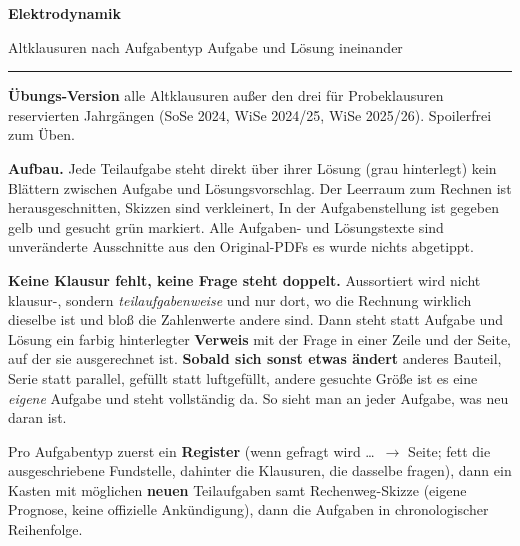 \documentclass[a4paper,10pt]{article}
\begin{document}
\thispagestyle{empty}
\vspace*{14mm}
{\sffamily\bfseries\Huge Elektrodynamik}\par\vspace{3mm}
{\sffamily\LARGE\color{Grau} Altklausuren nach Aufgabentyp \textendash{} Aufgabe und Lösung ineinander}\par\vspace{4mm}
{\color{black}\rule{\textwidth}{1.2pt}}\par\vspace{7mm}
{\large\textbf{Übungs-Version} \textendash{} alle Altklausuren
außer den drei für Probeklausuren reservierten Jahrgängen (SoSe 2024,
WiSe 2024/25, WiSe 2025/26). Spoilerfrei zum Üben.}\par\vspace{6mm}

\textbf{Aufbau.} Jede Teilaufgabe steht direkt über ihrer Lösung (grau
hinterlegt) \textendash{} kein Blättern zwischen Aufgabe und Lösungsvorschlag.
Der Leerraum zum Rechnen ist herausgeschnitten, Skizzen sind verkleinert,
In der Aufgabenstellung ist \colorbox{Marker!45}{gegeben} gelb und
\colorbox{MarkerG!45}{gesucht} grün markiert.
Alle Aufgaben- und Lösungstexte sind unveränderte Ausschnitte aus den
Original-PDFs \textendash{} es wurde nichts abgetippt.\par\vspace{3mm}

\textbf{Keine Klausur fehlt, keine Frage steht doppelt.} Aussortiert wird
nicht klausur-, sondern \emph{teilaufgabenweise} \textendash{} und nur dort,
wo die Rechnung wirklich dieselbe ist und bloß die Zahlenwerte andere sind.
Dann steht statt Aufgabe und Lösung ein farbig hinterlegter \textbf{Verweis}
mit der Frage in einer Zeile und der Seite, auf der sie ausgerechnet ist.
\textbf{Sobald sich sonst etwas ändert} \textendash{} anderes Bauteil,
Serie statt parallel, gefüllt statt luftgefüllt, andere gesuchte Größe
\textendash{} ist es eine \emph{eigene} Aufgabe und steht vollständig da.
So sieht man an jeder Aufgabe, was neu daran ist.
\par\vspace{3mm}

Pro Aufgabentyp zuerst ein \textbf{Register} (\glqq wenn gefragt wird \ldots\
$\rightarrow$ Seite\grqq{}; fett die ausgeschriebene Fundstelle, dahinter die
Klausuren, die dasselbe fragen), dann ein Kasten mit möglichen \textbf{neuen}
Teilaufgaben samt Rechenweg-Skizze (eigene Prognose, keine offizielle
Ankündigung), dann die Aufgaben in chronologischer Reihenfolge.
\par\vspace{7mm}
\end{document}
